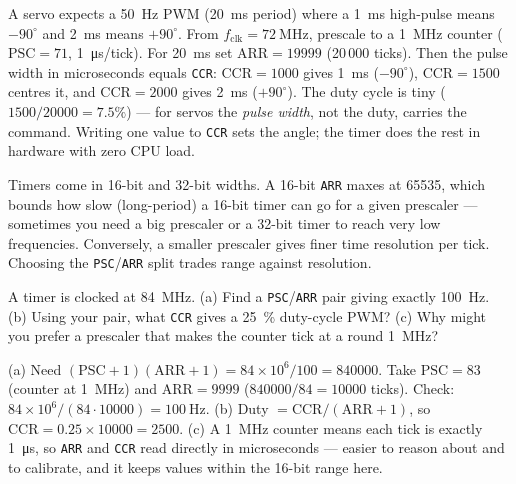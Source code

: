 \documentclass[11pt,a4paper,oneside]{book}
\newcommand{\code}[1]{\texttt{#1}}
\begin{document}
\begin{wexample}
A servo expects a \qty{50}{\hertz} PWM (\qty{20}{\milli\second} period) where a
\qty{1}{\milli\second} high-pulse means $-90^\circ$ and \qty{2}{\milli\second}
means $+90^\circ$. From $f_{\text{clk}}=\qty{72}{\mega\hertz}$, prescale to a
\qty{1}{\mega\hertz} counter ($\text{PSC}=71$, \qty{1}{\micro\second}/tick). For
\qty{20}{\milli\second} set $\text{ARR}=\num{19999}$ (20\,000 ticks). Then the
pulse width in microseconds equals \code{CCR}: $\text{CCR}=1000$ gives
\qty{1}{\milli\second} ($-90^\circ$), $\text{CCR}=1500$ centres it, and
$\text{CCR}=2000$ gives \qty{2}{\milli\second} ($+90^\circ$). The duty cycle is
tiny ($1500/20000 = 7.5\%$) --- for servos the \emph{pulse width}, not the duty,
carries the command. Writing one value to \code{CCR} sets the angle; the timer
does the rest in hardware with zero CPU load.
\end{wexample}

\begin{note}
Timers come in 16-bit and 32-bit widths. A 16-bit \code{ARR} maxes at
\num{65535}, which bounds how slow (long-period) a 16-bit timer can go for a
given prescaler --- sometimes you need a big prescaler or a 32-bit timer to reach
very low frequencies. Conversely, a smaller prescaler gives finer time resolution
per tick. Choosing the \code{PSC}/\code{ARR} split trades range against
resolution.
\end{note}

\begin{exercise}
A timer is clocked at \qty{84}{\mega\hertz}. (a) Find a \code{PSC}/\code{ARR}
pair giving exactly \qty{100}{\hertz}. (b) Using your pair, what \code{CCR}
gives a \qty{25}{\percent} duty-cycle PWM? (c) Why might you prefer a prescaler
that makes the counter tick at a round \qty{1}{\mega\hertz}?
\end{exercise}
\begin{solution}
(a) Need $(\text{PSC}+1)(\text{ARR}+1)=84\times10^6/100=\num{840000}$. Take
$\text{PSC}=83$ (counter at \qty{1}{\mega\hertz}) and $\text{ARR}=9999$
($840000/84=10000$ ticks). Check:
$84\times10^6/(84\cdot10000)=\qty{100}{\hertz}$. \checkmark\;
(b) Duty $=\text{CCR}/(\text{ARR}+1)$, so
$\text{CCR}=0.25\times10000=2500$. (c) A \qty{1}{\mega\hertz} counter means each
tick is exactly \qty{1}{\micro\second}, so \code{ARR} and \code{CCR} read
directly in microseconds --- easier to reason about and to calibrate, and it
keeps values within the 16-bit range here.
\end{solution}
\end{document}
